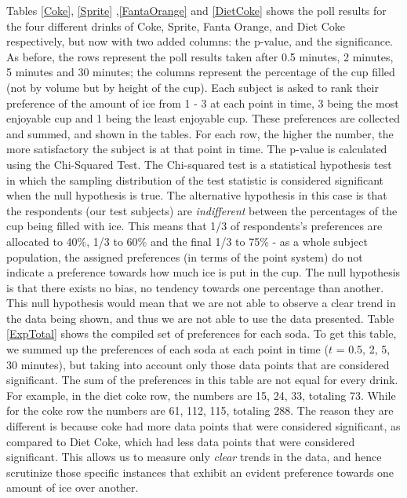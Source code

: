 \documentclass[oneside,12pt]{report}
\begin{document}
\vspace{12pt}
\noindent Tables \ref{Coke}, \ref{Sprite} ,\ref{FantaOrange} and \ref{DietCoke} shows the poll results for the four different drinks of Coke, Sprite, Fanta Orange, and Diet Coke respectively, but now with two added columns: the p-value, and the significance. As before, the rows represent the poll results taken after 0.5 minutes, 2 minutes, 5 minutes and 30 minutes; the columns represent the percentage of the cup filled (not by volume but by height of the cup). Each subject is asked to rank their preference of the amount of ice from 1 - 3 at each point in time, 3 being the most enjoyable cup and 1 being the least enjoyable cup. These preferences are collected and summed, and shown in the tables. For each row, the higher the number, the more satisfactory the subject is at that point in time. 
\vspace{12pt}
\newline
The p-value is calculated using the Chi-Squared Test. The Chi-squared test is a statistical hypothesis test in which the sampling distribution of the test statistic is considered significant when the null hypothesis is true. The alternative hypothesis in this case is that the respondents (our test subjects) are \emph{indifferent} between the percentages of the cup being filled with ice. This means that 1/3 of respondents's preferences are allocated to  40\%, 1/3 to 60\% and the final 1/3 to 75\% - as a whole subject population, the assigned preferences (in terms of the point system) do not indicate a preference towards how much ice is put in the cup. The null hypothesis is that there exists no bias, no tendency towards one percentage than another. This null hypothesis would mean that we are not able to observe a clear trend in the data being shown, and thus we are not able to use the data presented. 
\vspace{12pt}
\newline
\noindent Table \ref{ExpTotal} shows the compiled set of preferences for each soda. To get this table,  we summed up the preferences of each soda at each point in time ($t$ = 0.5, 2, 5, 30 minutes), but taking into account only those data points that are considered significant. The sum of the preferences in this table are not equal for every drink. For example, in the diet coke row, the numbers are 15, 24, 33, totaling 73. While for the coke row the numbers are 61, 112, 115, totaling 288. The reason they are different is because coke had more data points that were considered significant, as compared to Diet Coke, which had less data points that were considered significant. This allows us to measure only \emph{clear} trends in the data, and hence scrutinize those specific instances that exhibit an evident preference towards one amount of ice over another. 
\end{document}
